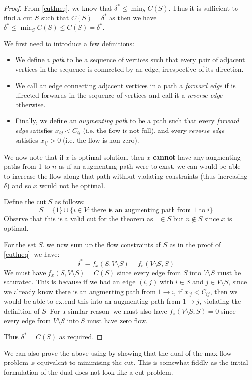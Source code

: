 \documentclass[../main.tex]{subfiles}
\begin{document}
\begin{proof}
  From \cref{cutIneq}, we know that $\delta^{*} \leq \min_{S} C(S)$.
  Thus it is sufficient to find a cut $S$ such that $C(S) = \delta^{*}$ as then we have $\delta^{*} \leq \min_{S} C(S) \leq C(S) = \delta^{*}$.

  We first need to introduce a few definitions:
  \begin{itemize}
    \item We define a \textit{path} to be a sequence of vertices such that every pair of adjacent vertices in the sequence is connected by an edge, irrespective of its direction.
    \item We call an edge connecting adjacent vertices in a path a \textit{forward edge} if is directed forwards in the sequence of vertices and call it a \textit{reverse edge} otherwise.
    \item Finally, we define an \textit{augmenting path} to be a path such that every \textit{forward edge} satisfies $x_{i j} < C_{i j}$ (i.e. the flow is not full), and every \textit{reverse edge} satisfies $x_{i j} > 0$ (i.e. the flow is non-zero).
  \end{itemize}
  We now note that if $x$ is optimal solution, then $x$ \textbf{cannot} have any augmenting paths from 1 to $n$ as if an augmenting path were to exist, we can would be able to increase the flow along that path without violating constraints (thus increasing $\delta$) and so $x$ would not be optimal.

  Define the cut $S$ as follows:
  \[
    S = \{1\} \cup \{i \in V: \text{there is an augmenting path from 1 to $i$}\}
  \]
  Observe that this is a valid cut for the theorem as $1 \in S$ but $n \notin S$ since $x$ is optimal.

  For the set $S$, we now sum up the flow constraints of $S$ as in the proof of \cref{cutIneq}, we have:
  \[
    \delta^{*} = f_x(S, V \setminus S) - f_x(V \setminus S, S)
  \]
  We must have $f_x(S, V \setminus S) = C(S)$ since every edge from $S$ into $V \setminus S$ must be saturated.
  This is because if we had an edge $(i, j)$ with $i \in S$ and $j \in V \setminus S$, since we already know there is an augmenting path from $1 \to i$, if $x_{i j} < C_{i j}$, then we would be able to extend this into an augmenting path from $1 \to j$, violating the definition of $S$.
  For a similar reason, we must also have $f_x(V \setminus S, S) = 0$ since every edge from $V \setminus S$ into $S$ must have zero flow.

  Thus $\delta^{*} = C(S)$ as required.
\end{proof}
\begin{remark}
  We can also prove the above using by showing that the dual of the max-flow problem is equivalent to minimising the cut.
  This is somewhat fiddly as the initial formulation of the dual does not look like a cut problem.
\end{remark}
\end{document}
